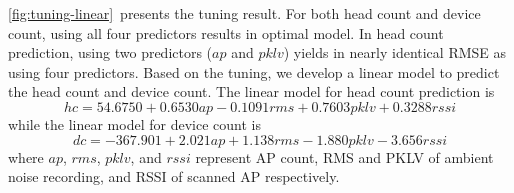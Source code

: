 	\autoref{fig:tuning-linear}~presents the tuning result. For both head count and device count, using all four predictors results in optimal model. In head count prediction, using two predictors ($ap$ and $pklv$) yields in nearly identical \ac{RMSE} as using four predictors. Based on the tuning, we develop a linear model to predict the head count and device count. The linear model for head count prediction is 
	\begin{equation}
		hc=54.6750+0.6530ap-0.1091rms+0.7603pklv+0.3288rssi
	\end{equation}
	while the linear model for device count is 
	\begin{equation}
		dc=-367.901+2.021ap+1.138rms-1.880pklv-3.656rssi
	\end{equation}
	where $ap$, $rms$, $pklv$, and $rssi$ represent \ac{AP} count, \ac{RMS} and \ac{PKLV} of ambient noise recording, and \ac{RSSI} of scanned \ac{AP} respectively.

	









